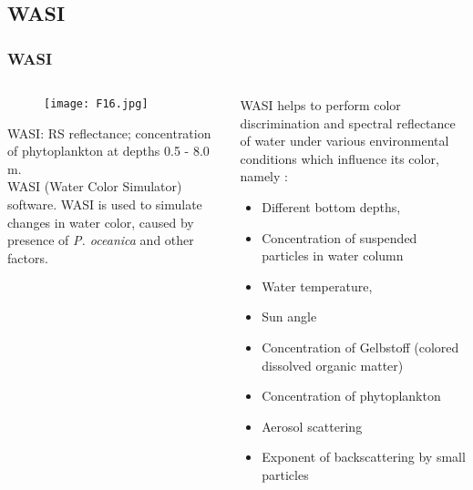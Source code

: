 \documentclass[pdflatex,compress]{beamer}
\begin{document}
\subsection{WASI}
\begin{frame}\frametitle{WASI}
\begin{minipage}[0.4\textheight]{\textwidth}
\begin{columns}[T]
\begin{column}{0.5\textwidth}
\begin{figure}[H]
	\centering
		\texttt{[image: F16.jpg]}
\end{figure}
\scriptsize{WASI: RS reflectance; concentration of phytoplankton at depths 0.5 - 8.0 m. \\
WASI (Water Color Simulator) software. WASI is used to simulate changes in water color, caused by presence of \emph{P. oceanica} and other factors.}
\end{column}
\begin{column}{0.5\textwidth}
\scriptsize{WASI helps to perform color discrimination and spectral reflectance of water
under various environmental conditions which influence its color, namely :
\begin{itemize}
	\item Different bottom depths,
	\item Concentration of suspended particles in water column
	\item Water temperature,
	\item Sun angle
	\item Concentration of Gelbstoff (colored dissolved organic matter)
	\item Concentration of phytoplankton
	\item Aerosol scattering
	\item Exponent of backscattering by small particles
\end{itemize}}
\end{column}
\end{columns}
\end{minipage}
\end{frame}
\end{document}
